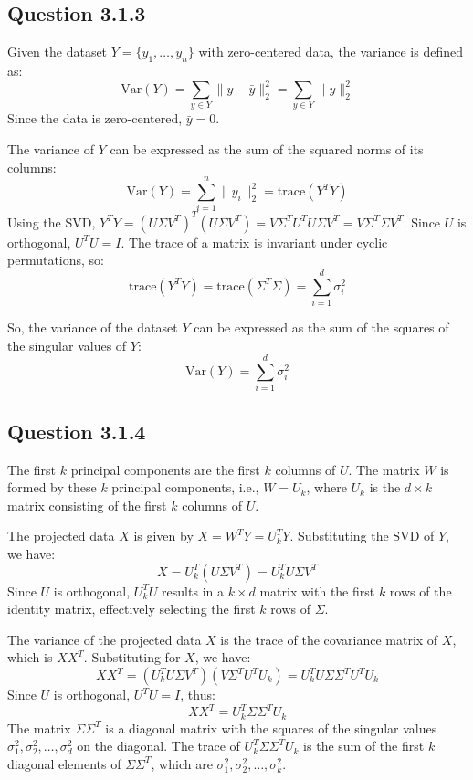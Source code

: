 \documentclass{article}
\begin{document}
\subsection{Question 3.1.3}


Given the dataset \( Y = \{y_1, \ldots, y_n\} \) with zero-centered data, the variance is defined as:
\[
\text{Var}(Y) = \sum_{y \in Y} \|y - \bar{y}\|^2_2 = \sum_{y \in Y} \|y\|^2_2
\]
Since the data is zero-centered, \(\bar{y} = 0\).

The variance of \( Y \) can be expressed as the sum of the squared norms of its columns:
\[
\text{Var}(Y) = \sum_{i=1}^{n} \|y_i\|^2_2 = \text{trace}(Y^T Y)
\]
Using the SVD, \( Y^T Y = (U \Sigma V^T)^T (U \Sigma V^T) = V \Sigma^T U^T U \Sigma V^T = V \Sigma^T \Sigma V^T \).
Since \( U \) is orthogonal, \( U^T U = I \).
The trace of a matrix is invariant under cyclic permutations, so:
\[
\text{trace}(Y^T Y) = \text{trace}(\Sigma^T \Sigma) = \sum_{i=1}^{d} \sigma_i^2
\]

So, the variance of the dataset \( Y \) can be expressed as the sum of the squares of the singular values of \( Y \):
\[
\text{Var}(Y) = \sum_{i=1}^{d} \sigma_i^2
\]

\newpage

\subsection{Question 3.1.4}

The first \( k \) principal components are the first \( k \) columns of \( U \). The matrix \( W \) is formed by these \( k \) principal components, i.e., \( W = U_k \), where \( U_k \) is the \( d \times k \) matrix consisting of the first \( k \) columns of \( U \).

The projected data \( X \) is given by \( X = W^T Y = U_k^T Y \). Substituting the SVD of \( Y \), we have:
\[
X = U_k^T (U \Sigma V^T) = U_k^T U \Sigma V^T
\]
Since \( U \) is orthogonal, \( U_k^T U \) results in a \( k \times d \) matrix with the first \( k \) rows of the identity matrix, effectively selecting the first \( k \) rows of \( \Sigma \).

The variance of the projected data \( X \) is the trace of the covariance matrix of \( X \), which is \( X X^T \). Substituting for \( X \), we have:
\[
X X^T = (U_k^T U \Sigma V^T)(V \Sigma^T U^T U_k) = U_k^T U \Sigma \Sigma^T U^T U_k
\]
Since \( U \) is orthogonal, \( U^T U = I \), thus:
\[
X X^T = U_k^T \Sigma \Sigma^T U_k
\]
The matrix \( \Sigma \Sigma^T \) is a diagonal matrix with the squares of the singular values \(\sigma_1^2, \sigma_2^2, \ldots, \sigma_d^2\) on the diagonal. The trace of \( U_k^T \Sigma \Sigma^T U_k \) is the sum of the first \( k \) diagonal elements of \( \Sigma \Sigma^T \), which are \(\sigma_1^2, \sigma_2^2, \ldots, \sigma_k^2\).
\end{document}
